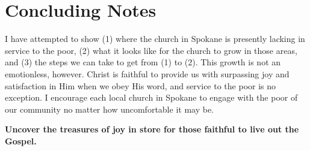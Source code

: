 \documentclass[12pt]{article}
\begin{document}
\section{Concluding Notes}

    \qChristianHedonism
    I have attempted to show (1) where the church in Spokane is presently lacking in service to the poor, (2) what it looks like for the church to grow in those areas, and (3) the steps we can take to get from (1) to (2).
    This growth is not an emotionless, however.
    Christ is faithful to provide us with surpassing joy and satisfaction in Him when we obey His word, and service to the poor is no exception.
    I encourage each local church in Spokane to engage with the poor of our community no matter how uncomfortable it may be.
    \par \textbf{Uncover the treasures of joy in store for those faithful to live out the Gospel.}
    \qJohnEdwardsJoy

{}

\end{document}
